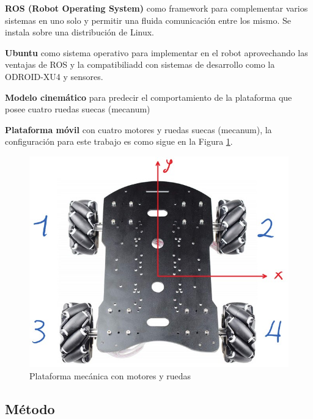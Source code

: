 \documentclass[conference]{IEEEtran}
\begin{document}
\textbf{ROS (Robot Operating System)} como framework para complementar varios
sistemas en uno solo y permitir una fluida comunicación entre los mismo. Se instala
sobre una distribución de Linux.

\textbf{Ubuntu} como sistema operativo para implementar en el robot aprovechando
las ventajas de ROS y la compatibiliadd con sistemas de desarrollo como la
ODROID-XU4 y sensores.

\textbf{Modelo cinemático} \cite{noauthor_gazebo_nodate} para predecir el comportamiento de la plataforma que
posee cuatro ruedas suecas (mecanum)

\textbf{Plataforma móvil} con cuatro motores y ruedas suecas (mecanum), la configuración
para este trabajo es como sigue en la Figura \ref{fig:platformmec}.

\begin{figure}
  \includegraphics[width=\linewidth]{figures/plataforma_config.jpg}
  \caption{Plataforma mecánica con motores y ruedas}
  \label{fig:platformmec}
\end{figure}

\subsection{Método}
\end{document}
